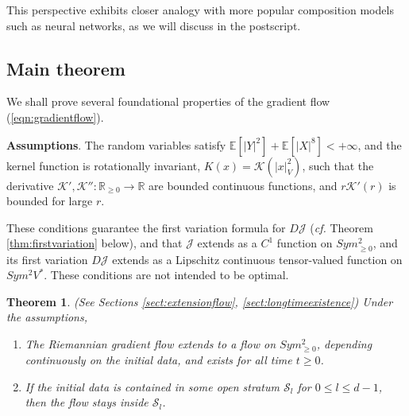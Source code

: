\documentclass[a4paper]{article}
\newtheorem{thm}{Theorem}[section]
\theoremstyle{definition}
\newcommand{\cf}{\emph{cf.} }
\newcommand{\R}{\mathbb{R}}
\newcommand{\E}{\mathbb{E}}
\newcommand{\1}{\mathbbm{1}}
\begin{document}
	
	
	This perspective exhibits closer analogy with more popular composition models such as neural networks, as we will discuss in the postscript.
	
	
	
	
	
	\subsection{Main theorem}
	
	
	
	
	
	
	
	
	
	
	
	We shall prove several foundational properties of the gradient flow (\ref{eqn:gradientflow}).
	
	
	\textbf{Assumptions}. The random variables satisfy $\E[|Y|^2]+\E[|X|^8]<+\infty$, and the kernel function  is rotationally invariant, $K(x)=\mathcal{K}(|x|_V^2)$, such that the derivative $\mathcal{K}', \mathcal{K}'': \R_{\geq 0}\to \R$ are bounded continuous functions, and $r\mathcal{K}'(r)$ is bounded for large $r$. 
	
	
	
	These conditions guarantee  the first variation formula for $D\mathcal{J}$ (\cf Theorem \ref{thm:firstvariation} below), and that $\mathcal{J}$ extends as a $C^1$ function on $Sym^2_{\geq 0}$, and its first variation $D\mathcal{J}$ extends as a Lipschitz continuous tensor-valued function on $Sym^2 V^*$. 	These conditions are not intended to be optimal.
	
	
	
	\begin{thm}\label{thm:longtimeexistence}
		(See Sections \ref{sect:extensionflow},  \ref{sect:longtimeexistence}) Under the assumptions, 
		\begin{enumerate}
			\item   The Riemannian gradient flow  extends to a flow on  $Sym^2_{\geq 0}$, depending continuously on the initial data, and exists for all time $t\geq 0$.
			
			
			
			\item   If the initial data is contained in some open stratum $\mathcal{S}_l$ for $0\leq l\leq d-1$, then the flow stays inside $\mathcal{S}_l$. 
			
			
			
			
		\end{enumerate}
		
		
		
		
		
		
		
	\end{thm}
	
\end{document}
